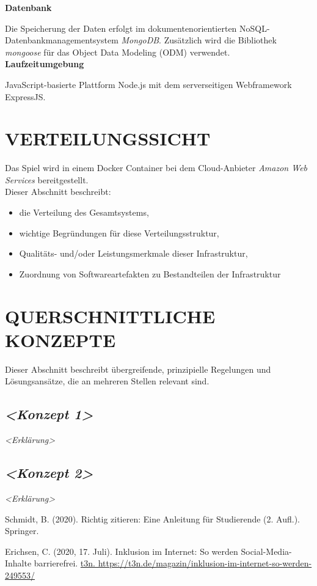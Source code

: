 \documentclass[letterpaper, 10 pt, conference]{ieeeconf}
\begin{document}
\textbf{Datenbank}

Die Speicherung der Daten erfolgt im dokumentenorientierten NoSQL-Datenbankmanagementsystem \textit{MongoDB}.  Zusätzlich wird die Bibliothek  \textit{mongoose} für das Object Data Modeling (ODM) verwendet.  \\

\textbf{Laufzeitumgebung}

JavaScript-basierte Plattform Node.js mit dem serverseitigen Webframework ExpressJS.

\section{VERTEILUNGSSICHT}
Das Spiel wird in einem Docker Container bei dem Cloud-Anbieter \textit{Amazon Web Services} bereitgestellt. \\

Dieser Abschnitt beschreibt:
\begin{itemize}
\item
  die Verteilung des Gesamtsystems,
\item
  wichtige Begründungen für diese Verteilungsstruktur,
\item
  Qualitäts- und/oder Leistungsmerkmale dieser Infrastruktur,
\item
  Zuordnung von Softwareartefakten zu Bestandteilen der Infrastruktur
\end{itemize}

\section{QUERSCHNITTLICHE KONZEPTE}

Dieser Abschnitt beschreibt übergreifende, prinzipielle Regelungen und
Lösungsansätze, die an mehreren Stellen relevant sind.

\subsection{\texorpdfstring{\emph{\textless Konzept
1\textgreater{}}}{\textless Konzept 1\textgreater{}}}

\emph{\textless Erklärung\textgreater{}}

\subsection{\texorpdfstring{\emph{\textless Konzept
2\textgreater{}}}{\textless Konzept 2\textgreater{}}}

\emph{\textless Erklärung\textgreater{}}

\begin{thebibliography}{99}

 Schmidt, B. (2020). Richtig zitieren: Eine Anleitung für Studierende (2. Aufl.). Springer.

 Erichsen, C. (2020, 17. Juli). Inklusion im Internet: So werden Social-Media-Inhalte barrierefrei. \url{t3n. https://t3n.de/magazin/inklusion-im-internet-so-werden-249553/}

\end{thebibliography}


\addtolength{\textheight}{-12cm} 
\end{document}
